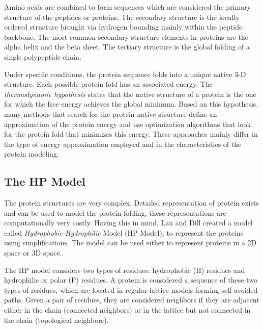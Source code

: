 Amino acids are combined to form sequences which are considered the primary structure of the peptides or proteins. The secondary structure is the locally ordered structure brought via hydrogen bounding mainly within the peptide backbone. The most common secondary structure elements in proteins are the alpha helix and the beta sheet. The tertiary structure is the global folding of a single polypeptide chain.


Under specific conditions, the protein sequence folds into a unique native 3-D structure. Each possible protein fold has an associated energy. The \emph{thermodynamic hypothesis} states that the native structure of a protein is the one for which the free energy achieves the global minimum. Based on this hypothesis, many methods \cite{custodio2004investigation, hsu2003growth, krasnogor2002multimeme, lin2011protein, unger1993genetic} that search for the protein native structure define an approximation of the protein energy and use optimization algorithms that look for the protein fold that minimizes this energy. These approaches mainly differ in the type of energy approximation employed and in the characteristics of the protein modeling.


\subsection{The HP Model} \label{sec:hpModel}


The protein structures are very complex. Detailed representation of protein exists and can be used to model the protein folding, these representations are computationally very costly. Having this in mind, Lau and Dill \cite{lau1989lattice} created a model called \textit{Hydrophobic-Hydrophilic} Model (HP Model), to represent the proteins using simplifications. The model can be used either to represent proteins in a 2D space or 3D space.


The HP model considers two types of residues:  hydrophobic (H) residues  and hydrophilic or polar (P) residues. A protein is considered a sequence of these two types of residues, which are located in regular lattice models forming self-avoided paths. Given a pair of residues, they are considered neighbors if they are adjacent  either in the chain (connected neighbors) or  in the lattice but not connected in the chain (topological neighbors).

